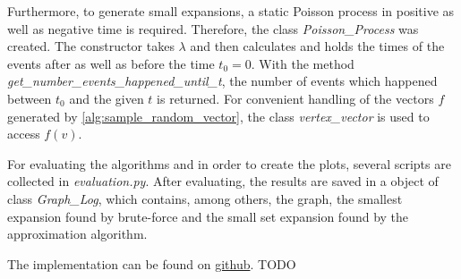 Furthermore, to generate small expansions, a static Poisson process in positive as well as negative time is required. Therefore, the class \textit{Poisson\_Process} was created. The constructor takes $\lambda$ and then calculates and holds the times of the events after as well as before the time $t_0=0$. With the method \textit{get\_number\_events\_happened\_until\_t}, the number of events which happened between $t_0$ and the given $t$ is returned. 
For convenient handling of the vectors $f$ generated by \cref{alg:sample_random_vector}, the class \textit{vertex\_vector} is used to access $f(v)$.

For evaluating the algorithms and in order to create the plots, several scripts are collected in \textit{evaluation.py}.
After evaluating, the results are saved in a object of class \textit{Graph\_Log}, which contains, among others, the graph, the smallest expansion found by brute-force and the small set expansion found by the approximation algorithm.

The implementation can be found on \href{github.com}{github}. TODO %
